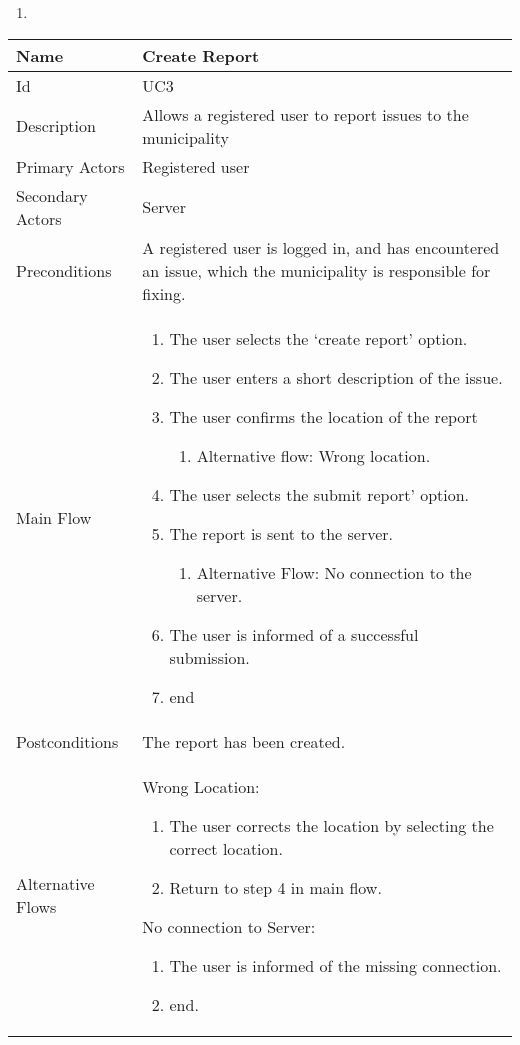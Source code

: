 \begin{enumerate}
\item 
\end{enumerate}

\begin{tabularx}{\textwidth}{|l|X|}
\hline
Name              & Create Report\\ \hline 
Id                & UC3 \\ \hline
Description       & Allows a registered user to report issues to the municipality \\ \hline
Primary Actors    & Registered user \\ \hline
Secondary Actors  & Server \\ \hline
Preconditions     & A registered user is logged in, and has encountered an issue, which the municipality is responsible for fixing. \\ \hline
Main Flow         &
{\footnotesize \begin{enumerate}
\item The user selects the ‘create report’ option.
\item The user enters a short description of the issue.
\item The user confirms the location of the report
\begin{enumerate}
\item Alternative flow: Wrong location.
\end{enumerate}
\item The user selects the submit report’ option.
\item The report is sent to the server.
\begin{enumerate}
\item Alternative Flow: No connection to the server.
\end{enumerate}
\item The user is informed of a successful submission.
\item end
\end{enumerate}} \\ \hline
Postconditions    & The report has been created. \\ \hline
Alternative Flows & 
Wrong Location:
{\footnotesize \begin{enumerate}
\item The user corrects the location by selecting the correct location.
\item Return to step 4 in main flow.
\end{enumerate}}
No connection to Server:
{\footnotesize \begin{enumerate}
\item The user is informed of the missing connection.
\item end.
\end{enumerate}}
\\ \hline
\end{tabularx}

